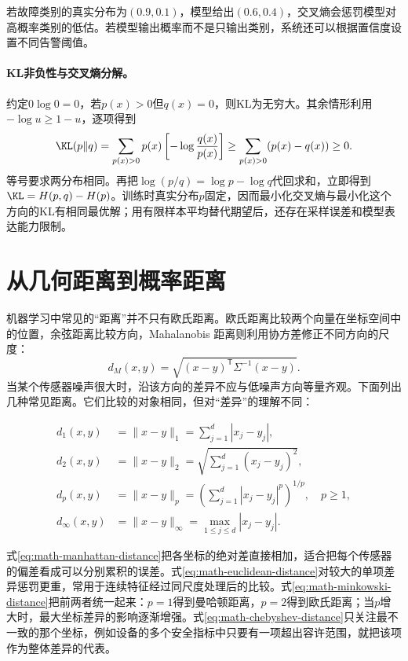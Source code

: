 \begin{example}
 若故障类别的真实分布为$(0.9,0.1)$，模型给出$(0.6,0.4)$，交叉熵会惩罚模型对高概率类别的低估。若模型输出概率而不是只输出类别，系统还可以根据置信度设置不同告警阈值。
\end{example}

\paragraph{KL非负性与交叉熵分解。}
约定$0\log0=0$，若$p(x)>0$但$q(x)=0$，则KL为无穷大。其余情形利用$-\log u\geq1-u$，逐项得到
\begin{equation}
 \KL(p\|q)=\sum_{p(x)>0}p(x)\left[-\log\frac{q(x)}{p(x)}\right]
 \geq\sum_{p(x)>0}(p(x)-q(x))\geq0.
\end{equation}
等号要求两分布相同。再把$\log(p/q)=\log p-\log q$代回求和，立即得到$\KL=H(p,q)-H(p)$。训练时真实分布$p$固定，因而最小化交叉熵与最小化这个方向的KL有相同最优解；用有限样本平均替代期望后，还存在采样误差和模型表达能力限制。

\section{从几何距离到概率距离}
机器学习中常见的“距离”并不只有欧氏距离。欧氏距离比较两个向量在坐标空间中的位置，余弦距离比较方向，Mahalanobis 距离则利用协方差修正不同方向的尺度：
\begin{equation}
 d_M(x,y)=\sqrt{(x-y)^{\mathsf T}\Sigma^{-1}(x-y)}.
\end{equation}
当某个传感器噪声很大时，沿该方向的差异不应与低噪声方向等量齐观。下面列出几种常见距离。它们比较的对象相同，但对“差异”的理解不同：

\begin{align}
 d_1(x,y)&=\|x-y\|_1=\sum_{j=1}^{d}|x_j-y_j|,\label{eq:math-manhattan-distance}\\
 d_2(x,y)&=\|x-y\|_2=\sqrt{\sum_{j=1}^{d}(x_j-y_j)^2},\label{eq:math-euclidean-distance}\\
 d_p(x,y)&=\|x-y\|_p=\left(\sum_{j=1}^{d}|x_j-y_j|^p\right)^{1/p},\quad p\geq1,\label{eq:math-minkowski-distance}\\
 d_\infty(x,y)&=\|x-y\|_\infty=\max_{1\leq j\leq d}|x_j-y_j|.\label{eq:math-chebyshev-distance}
\end{align}

式\eqref{eq:math-manhattan-distance}把各坐标的绝对差直接相加，适合把每个传感器的偏差看成可以分别累积的误差。式\eqref{eq:math-euclidean-distance}对较大的单项差异惩罚更重，常用于连续特征经过同尺度处理后的比较。式\eqref{eq:math-minkowski-distance}把前两者统一起来：$p=1$得到曼哈顿距离，$p=2$得到欧氏距离；当$p$增大时，最大坐标差异的影响逐渐增强。式\eqref{eq:math-chebyshev-distance}只关注最不一致的那个坐标，例如设备的多个安全指标中只要有一项超出容许范围，就把该项作为整体差异的代表。

